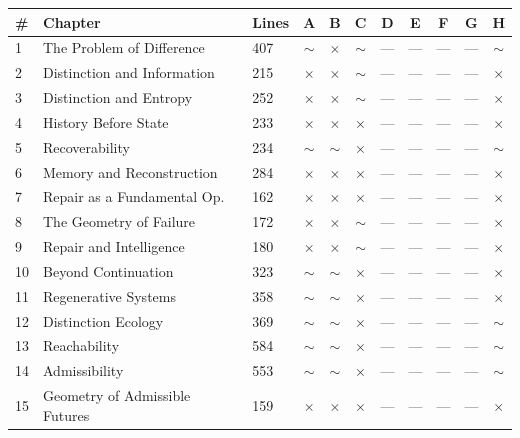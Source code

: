 \documentclass[11pt]{report}
\newcommand{\statusgap}{\textcolor{red!70!black}{$\times$}}
\newcommand{\statuspartial}{\textcolor{orange!80!black}{$\sim$}}
\begin{document}
\begin{longtable}{@{}p{0.5cm}p{4.3cm}p{1.3cm}cccccccc@{}}
\toprule
\# & Chapter & Lines & A & B & C & D & E & F & G & H \\
\midrule
\endhead
1  & The Problem of Difference        & 407 & \statuspartial & \statusgap & \statuspartial & --- & --- & --- & --- & \statuspartial \\
2  & Distinction and Information      & 215 & \statusgap & \statusgap & \statuspartial & --- & --- & --- & --- & \statusgap \\
3  & Distinction and Entropy          & 252 & \statusgap & \statusgap & \statuspartial & --- & --- & --- & --- & \statusgap \\
4  & History Before State             & 233 & \statusgap & \statusgap & \statusgap & --- & --- & --- & --- & \statusgap \\
5  & Recoverability                   & 234 & \statuspartial & \statuspartial & \statusgap & --- & --- & --- & --- & \statuspartial \\
6  & Memory and Reconstruction        & 284 & \statusgap & \statusgap & \statusgap & --- & --- & --- & --- & \statusgap \\
7  & Repair as a Fundamental Op.\     & 162 & \statusgap & \statusgap & \statusgap & --- & --- & --- & --- & \statusgap \\
8  & The Geometry of Failure          & 172 & \statusgap & \statusgap & \statuspartial & --- & --- & --- & --- & \statusgap \\
9  & Repair and Intelligence          & 180 & \statusgap & \statusgap & \statuspartial & --- & --- & --- & --- & \statusgap \\
10 & Beyond Continuation              & 323 & \statuspartial & \statuspartial & \statusgap & --- & --- & --- & --- & \statusgap \\
11 & Regenerative Systems             & 358 & \statuspartial & \statuspartial & \statusgap & --- & --- & --- & --- & \statusgap \\
12 & Distinction Ecology              & 369 & \statuspartial & \statuspartial & \statusgap & --- & --- & --- & --- & \statuspartial \\
13 & Reachability                     & 584 & \statuspartial & \statuspartial & \statusgap & --- & --- & --- & --- & \statuspartial \\
14 & Admissibility                    & 553 & \statuspartial & \statuspartial & \statusgap & --- & --- & --- & --- & \statuspartial \\
15 & Geometry of Admissible Futures   & 159 & \statusgap & \statusgap & \statusgap & --- & --- & --- & --- & \statusgap \\

\end{longtable}
\end{document}
